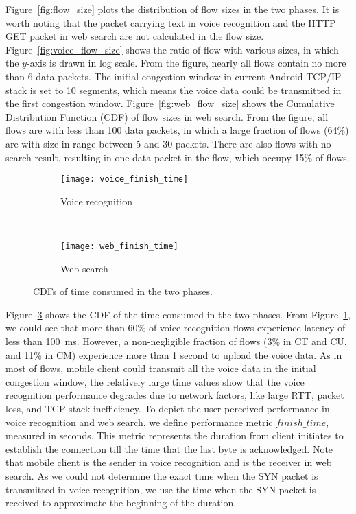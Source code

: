 Figure~\ref{fig:flow_size} plots the distribution of flow sizes in the two phases. It is worth noting that the packet carrying text in voice recognition and the HTTP GET packet in web search are not calculated in the flow size. Figure~\ref{fig:voice_flow_size} shows the ratio of flow with various sizes, in which the $y$-axis is drawn in log scale. From the figure, nearly all flows contain no more than 6 data packets. The initial congestion window in current Android TCP/IP stack is set to 10 segments\cite{dukkipati2010argument}, which means the voice data could be transmitted in the first congestion window. Figure~\ref{fig:web_flow_size} shows the Cumulative Distribution Function (CDF) of flow sizes in web search. From the figure, all flows are with less than 100 data packets, in which a large fraction of flows (64\%) are with size in range between 5 and 30 packets. There are also flows with no search result, resulting in one data packet in the flow, which occupy 15\% of flows.

\begin{figure}[th]
\centering
\begin{subfigure}[b]{0.8\linewidth}
	\texttt{[image: voice\_finish\_time]}
\caption{Voice recognition}
\label{fig:voice_finish_time}
\end{subfigure} \\
\begin{subfigure}[b]{0.8\linewidth}
	\texttt{[image: web\_finish\_time]}
\caption{Web search}
\label{fig:web_finish_time}
\end{subfigure}
\caption{CDFs of time consumed in the two phases.}
\label{fig:finish_time}
\end{figure}

Figure~\ref{fig:finish_time} shows the CDF of the time consumed in the two phases. From Figure~\ref{fig:voice_finish_time}, we could see that more than 60\% of voice recognition flows experience latency of less than 100~ms. However, a non-negligible fraction of flows (3\% in CT and CU, and 11\% in CM) experience more than 1 second to upload the voice data. As in most of flows, mobile client could transmit all the voice data in the initial congestion window, the relatively large time values show that the voice recognition performance degrades due to network factors, like large RTT, packet loss, and TCP stack inefficiency. To depict the user-perceived performance in voice recognition and web search, we define performance metric $finish\_time$, measured in seconds. This metric represents the duration from client initiates to establish the connection till the time that the last byte is acknowledged. Note that mobile client is the sender in voice recognition and is the receiver in web search. As we could not determine the exact time when the SYN packet is transmitted in voice recognition, we use the time when the SYN packet is received to approximate the beginning of the duration.

